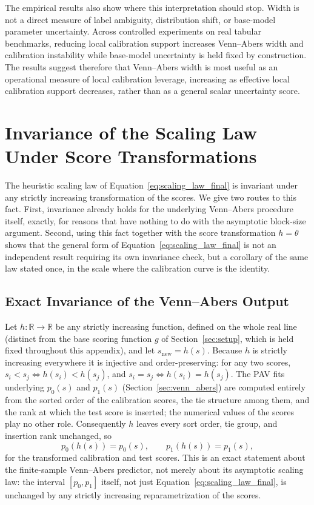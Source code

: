 \documentclass[11pt]{article}
\begin{document}
	The empirical results also show where this interpretation should stop. Width is not a direct measure of label ambiguity, distribution shift, or base-model parameter uncertainty. Across controlled experiments on real tabular benchmarks, reducing local calibration support increases Venn--Abers width and calibration instability while base-model uncertainty is held fixed by construction. The results suggest therefore that Venn--Abers width is most useful as an operational measure of local calibration leverage, increasing as effective local calibration support decreases, rather than as a general scalar uncertainty score.

	\appendix
	\section{Invariance of the Scaling Law Under Score Transformations}
	\label{sec:appendix_invariance}

	The heuristic scaling law of Equation~\ref{eq:scaling_law_final} is invariant under any strictly increasing transformation of the scores. We give two routes to this fact. First, invariance already holds for the underlying Venn--Abers procedure itself, exactly, for reasons that have nothing to do with the asymptotic block-size argument. Second, using this fact together with the score transformation $h=\theta$ shows that the general form of Equation~\ref{eq:scaling_law_final} is not an independent result requiring its own invariance check, but a corollary of the same law stated once, in the scale where the calibration curve is the identity.

	\subsection{Exact Invariance of the Venn--Abers Output}
	\label{subsec:appendix_exact_invariance}

	Let $h:\mathbb{R}\to\mathbb{R}$ be any strictly increasing function, defined on the whole real line (distinct from the base scoring function $g$ of Section~\ref{sec:setup}, which is held fixed throughout this appendix), and let $s_{\text{new}}=h(s)$. Because $h$ is strictly increasing everywhere it is injective and order-preserving: for any two scores, $s_i<s_j \iff h(s_i)<h(s_j)$, and $s_i=s_j \iff h(s_i)=h(s_j)$. The PAV fits underlying $p_0(s)$ and $p_1(s)$ (Section~\ref{sec:venn_abers}) are computed entirely from the sorted order of the calibration scores, the tie structure among them, and the rank at which the test score is inserted; the numerical values of the scores play no other role. Consequently $h$ leaves every sort order, tie group, and insertion rank unchanged, so
	\begin{equation}
		p_0(h(s)) = p_0(s), \qquad p_1(h(s)) = p_1(s),
		\label{eq:exact_invariance}
	\end{equation}
	for the transformed calibration and test scores. This is an exact statement about the finite-sample Venn--Abers predictor, not merely about its asymptotic scaling law: the interval $[p_0,p_1]$ itself, not just Equation~\ref{eq:scaling_law_final}, is unchanged by any strictly increasing reparametrization of the scores.
\end{document}
